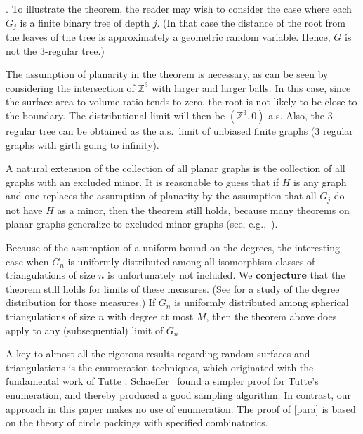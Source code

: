 \documentclass[12pt,naturalnames]{article}
\numberwithin{equation}{section}
\numberwithin{figure}{section}
\numberwithin{theorem}{section}
\newcommand{\Z}{\mathbb{Z}}
\def\Schaeffer{MR2001i:05142}
\def\Ma99{MR2000k:83024}
\def\GW00{MR1741015}
\def\Tu62{MR24:A695}
\def\Thomas{MR2001e:05118}
\begin{document}
\medskip
{}.
To illustrate the theorem, the reader may wish to consider the case where
each $G_j$ is a finite binary tree of depth $j$.  (In that case
the distance of the root from the leaves of the tree is approximately
a geometric random variable.  Hence, $G$ is not the $3$-regular tree.)
\par
The assumption of planarity in the theorem is necessary, as can be seen by
considering the intersection of $\Z^3$ with larger and larger balls.
In this case, since the surface area to volume ratio tends to zero,
the root is not likely to be close to the boundary.
The distributional limit will then be $(\Z^3,0)$ a.s.
Also, the $3$-regular tree can be obtained as
the a.s.\ limit of unbiased finite graphs ($3$ regular
graphs with girth going to infinity).
\par
A natural extension of the collection of all planar
graphs is the collection of all graphs with an excluded minor.
It is reasonable to guess that if $H$ is any graph
and one replaces the assumption of planarity by the assumption
that all $G_j$ do not have $H$ as a minor, then the theorem still
holds, because many theorems on planar graphs generalize to excluded
minor graphs (see, e.g.,~\cite{\Thomas}).
\par
Because of the assumption of a uniform bound on the degrees,
the interesting case when $G_n$ is uniformly distributed
among all isomorphism classes of triangulations of size $n$ is
unfortunately not included.
We {\bf conjecture} that the theorem still holds for limits of these measures.
(See \cite{\Ma99,\GW00}
for a study of the degree distribution for those measures.)
If $G_n$ is uniformly distributed among spherical triangulations
of size $n$ with degree at most $M$, then the theorem above does
apply to any (subsequential) limit of $G_n$.
\par %
A key to almost all the rigorous results regarding random
surfaces and triangulations
is the enumeration techniques, which originated with the fundamental work
of Tutte \cite{\Tu62}.
Schaeffer~\cite{\Schaeffer} found a simpler proof for Tutte's enumeration,
and thereby produced a good sampling algorithm.
  In contrast, our approach in this paper makes no use of enumeration.
The proof of \ref{para} is based on the theory of circle packings with specified
combinatorics.
\medskip %
\end{document}
